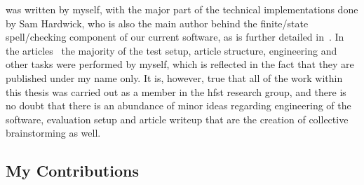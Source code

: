 \documentclass[officiallayout,final]{unihelcompling}
\begin{document}
was written by myself, with the major part of the technical implementations
done by Sam Hardwick, who is also the main author behind the finite\-/state
spell\-/checking component of our current software, as is further detailed
in~\citet{linden2011hfst}.  In the
articles~ the majority
of the test setup, article structure, engineering and other tasks were
performed by myself, which is reflected in the fact that they are published
under my name only. It is, however, true that all of the work within this
thesis was carried out as a member in the \gls{hfst} research group, and there
is no doubt that there is an abundance of minor ideas regarding engineering of
the software, evaluation setup and article writeup that are the creation of
collective brainstorming as well.

\subsection{My Contributions}
\label{subsec:contributions}
\end{document}
